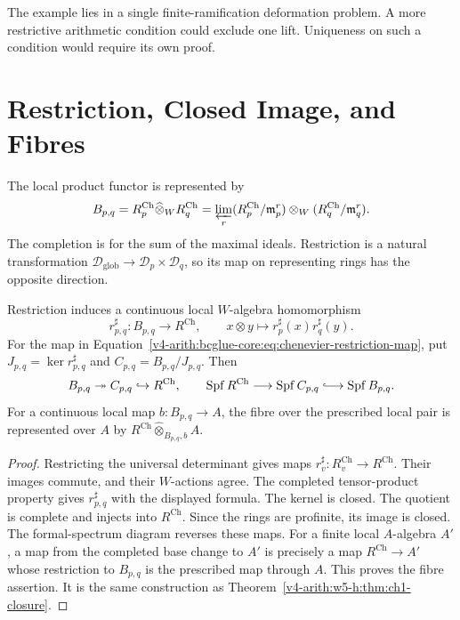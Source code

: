 The example lies in a single finite-ramification deformation problem.
A more restrictive arithmetic condition could exclude one lift.
Uniqueness on such a condition would require its own proof.

\section{Restriction, Closed Image, and Fibres}
\label{v4-arith:bcglue-core:prismatic}

The local product functor is represented by
\[
 B_{p,q}=R_p^{\mathrm{Ch}}\widehat\otimes_W R_q^{\mathrm{Ch}}
 =\varprojlim_r
 (R_p^{\mathrm{Ch}}/\mathfrak m_p^r)
       \otimes_W(R_q^{\mathrm{Ch}}/\mathfrak m_q^r).
\]
The completion is for the sum of the maximal ideals.
Restriction is a natural transformation
$\mathcal D_{\mathrm{glob}}\to\mathcal D_p\times\mathcal D_q$,
so its map on representing rings has the opposite direction.

\begin{proposition}
\label{v4-arith:bcglue-core:thm:prismatic-nygaard-transition}
\ClaimStatusProvedHere
Restriction induces a continuous local $W$-algebra homomorphism
\begin{equation}
\label{v4-arith:bcglue-core:eq:chenevier-restriction-map}
 r_{p,q}^{\sharp}:B_{p,q}\longrightarrow R^{\mathrm{Ch}},
 \qquad x\otimes y\longmapsto r_p^{\sharp}(x)r_q^{\sharp}(y).
\end{equation}
For the map in Equation~\eqref{v4-arith:bcglue-core:eq:chenevier-restriction-map},
put $J_{p,q}=\ker r_{p,q}^{\sharp}$ and
$C_{p,q}=B_{p,q}/J_{p,q}$. Then
\[
 B_{p,q}\twoheadrightarrow C_{p,q}\hookrightarrow R^{\mathrm{Ch}},
 \qquad
 \operatorname{Spf}R^{\mathrm{Ch}}\longrightarrow
 \operatorname{Spf}C_{p,q}\lhook\joinrel\longrightarrow
 \operatorname{Spf}B_{p,q}.
\]
For a continuous local map $b:B_{p,q}\to A$, the fibre over the
prescribed local pair is represented over $A$ by
$R^{\mathrm{Ch}}\widehat\otimes_{B_{p,q},b}A$.
\end{proposition}

\begin{proof}
Restricting the universal determinant gives maps
$r_v^{\sharp}:R_v^{\mathrm{Ch}}\to R^{\mathrm{Ch}}$.
Their images commute, and their $W$-actions agree.
The completed tensor-product property gives
$r_{p,q}^{\sharp}$ with the displayed formula.
The kernel is closed. The quotient is complete and injects into
$R^{\mathrm{Ch}}$. Since the rings are profinite, its image is
closed. The formal-spectrum diagram reverses these maps.
For a finite local $A$-algebra $A'$, a map from the completed
base change to $A'$ is precisely a map $R^{\mathrm{Ch}}\to A'$
whose restriction to $B_{p,q}$ is the prescribed map through $A$.
This proves the fibre assertion. It is the same construction as
Theorem~\ref{v4-arith:w5-h:thm:ch1-closure}.
\end{proof}

